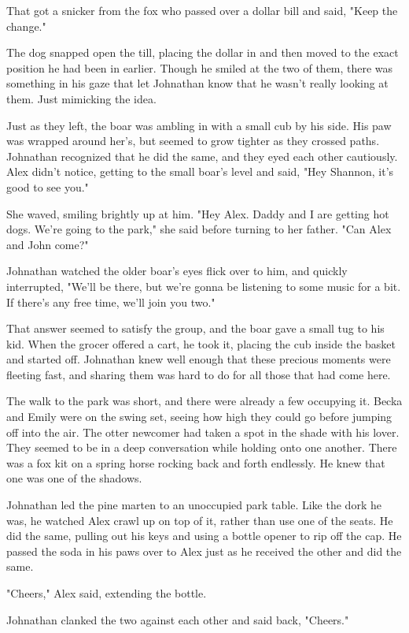 That got a snicker from the fox who passed over a dollar bill and said, "Keep the change."

The dog snapped open the till, placing the dollar in and then moved to the exact position he had been in earlier. Though he smiled at the two of them, there was something in his gaze that let Johnathan know that he wasn't really looking at them. Just mimicking the idea.

Just as they left, the boar was ambling in with a small cub by his side. His paw was wrapped around her's, but seemed to grow tighter as they crossed paths. Johnathan recognized that he did the same, and they eyed each other cautiously. Alex didn't notice, getting to the small boar's level and said, "Hey Shannon, it's good to see you."

She waved, smiling brightly up at him. "Hey Alex. Daddy and I are getting hot dogs. We're going to the park," she said before turning to her father. "Can Alex and John come?"

Johnathan watched the older boar's eyes flick over to him, and quickly interrupted, "We'll be there, but we're gonna be listening to some music for a bit. If there's any free time, we'll join you two."

That answer seemed to satisfy the group, and the boar gave a small tug to his kid. When the grocer offered a cart, he took it, placing the cub inside the basket and started off. Johnathan knew well enough that these precious moments were fleeting fast, and sharing them was hard to do for all those that had come here.

The walk to the park was short, and there were already a few occupying it. Becka and Emily were on the swing set, seeing how high they could go before jumping off into the air. The otter newcomer had taken a spot in the shade with his lover. They seemed to be in a deep conversation while holding onto one another. There was a fox kit on a spring horse rocking back and forth endlessly. He knew that one was one of the shadows.

Johnathan led the pine marten to an unoccupied park table. Like the dork he was, he watched Alex crawl up on top of it, rather than use one of the seats. He did the same, pulling out his keys and using a bottle opener to rip off the cap. He passed the soda in his paws over to Alex just as he received the other and did the same.

"Cheers," Alex said, extending the bottle.

Johnathan clanked the two against each other and said back, "Cheers."

